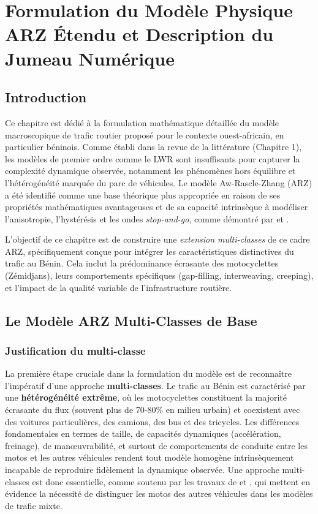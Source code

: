 \chapter{Formulation du Modèle Physique ARZ Étendu et Description du Jumeau Numérique}
\label{chap:formulation_modele}

\section{Introduction}
Ce chapitre est dédié à la formulation mathématique détaillée du modèle macroscopique de trafic routier proposé pour le contexte ouest-africain, en particulier béninois. Comme établi dans la revue de la littérature (Chapitre 1), les modèles de premier ordre comme le LWR sont insuffisants pour capturer la complexité dynamique observée, notamment les phénomènes hors équilibre et l'hétérogénéité marquée du parc de véhicules. Le modèle Aw-Rascle-Zhang (ARZ) a été identifié comme une base théorique plus appropriée en raison de ses propriétés mathématiques avantageuses et de sa capacité intrinsèque à modéliser l'anisotropie, l'hystérésis et les ondes \textit{stop-and-go}, comme démontré par \cite{Aw2000} et \cite{Zhang2002}.

L'objectif de ce chapitre est de construire une \textit{extension multi-classes} de ce cadre ARZ, spécifiquement conçue pour intégrer les caractéristiques distinctives du trafic au Bénin. Cela inclut la prédominance écrasante des motocyclettes (Zémidjans), leurs comportements spécifiques (gap-filling, interweaving, creeping), et l'impact de la qualité variable de l'infrastructure routière.

\section{Le Modèle ARZ Multi-Classes de Base}
\subsection{Justification du multi-classe}
La première étape cruciale dans la formulation du modèle est de reconnaître l'impératif d'une approche \textbf{multi-classes}. Le trafic au Bénin est caractérisé par une \textbf{hétérogénéité extrême}, où les motocyclettes constituent la majorité écrasante du flux (souvent plus de 70-80\% en milieu urbain) et coexistent avec des voitures particulières, des camions, des bus et des tricycles. Les différences fondamentales en termes de taille, de capacités dynamiques (accélération, freinage), de manœuvrabilité, et surtout de comportements de conduite entre les motos et les autres véhicules rendent tout modèle homogène intrinsèquement incapable de reproduire fidèlement la dynamique observée. Une approche multi-classes est donc essentielle, comme soutenu par les travaux de \cite{Lee2008} et \cite{Meng2007}, qui mettent en évidence la nécessité de distinguer les motos des autres véhicules dans les modèles de trafic mixte.

